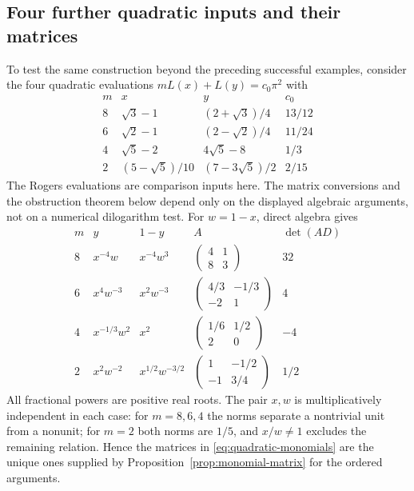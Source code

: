 \documentclass[11pt,reqno]{amsart}
\theoremstyle{remark}
\numberwithin{equation}{section}
\begin{document}
\subsection{Four further quadratic inputs and their matrices}
\label{sec:quadratic-inputs}
To test the same construction beyond the preceding successful examples,
consider the four quadratic evaluations $mL(x)+L(y)=c_0\pi^2$ with
\begin{equation}\label{eq:quadratic-inputs}
\begin{array}{c|c|c|c}
 m&x&y&c_0\\\hline
 8&\sqrt3-1&(2+\sqrt3)/4&13/12\\[2pt]
 6&\sqrt2-1&(2-\sqrt2)/4&11/24\\[2pt]
 4&\sqrt5-2&4\sqrt5-8&1/3\\[2pt]
 2&(5-\sqrt5)/10&(7-3\sqrt5)/2&2/15
\end{array}
\end{equation}
The Rogers evaluations are comparison inputs here. The matrix
conversions and the obstruction theorem below depend only on the
displayed algebraic arguments, not on a numerical dilogarithm test.
For $w=1-x$, direct algebra gives
\begin{equation}\label{eq:quadratic-monomials}
\begin{array}{c|cc|c|c}
 m&y&1-y&A&\det(AD)\\\hline
 8&x^{-4}w&x^{-4}w^3&
 \left(\begin{smallmatrix}4&1\\8&3\end{smallmatrix}\right)&32\\[3pt]
 6&x^4w^{-3}&x^2w^{-3}&
 \left(\begin{smallmatrix}4/3&-1/3\\-2&1\end{smallmatrix}\right)&4\\[3pt]
 4&x^{-1/3}w^2&x^2&
 \left(\begin{smallmatrix}1/6&1/2\\2&0\end{smallmatrix}\right)&-4\\[3pt]
 2&x^2w^{-2}&x^{1/2}w^{-3/2}&
 \left(\begin{smallmatrix}1&-1/2\\-1&3/4\end{smallmatrix}\right)&1/2
\end{array}
\end{equation}
All fractional powers are positive real roots. The pair $x,w$ is
multiplicatively independent in each case: for $m=8,6,4$ the norms
separate a nontrivial unit from a nonunit; for $m=2$ both norms are
$1/5$, and $x/w\ne1$ excludes the remaining relation. Hence the
matrices in \eqref{eq:quadratic-monomials} are the unique ones supplied
by Proposition~\ref{prop:monomial-matrix} for the ordered arguments.
\end{document}
